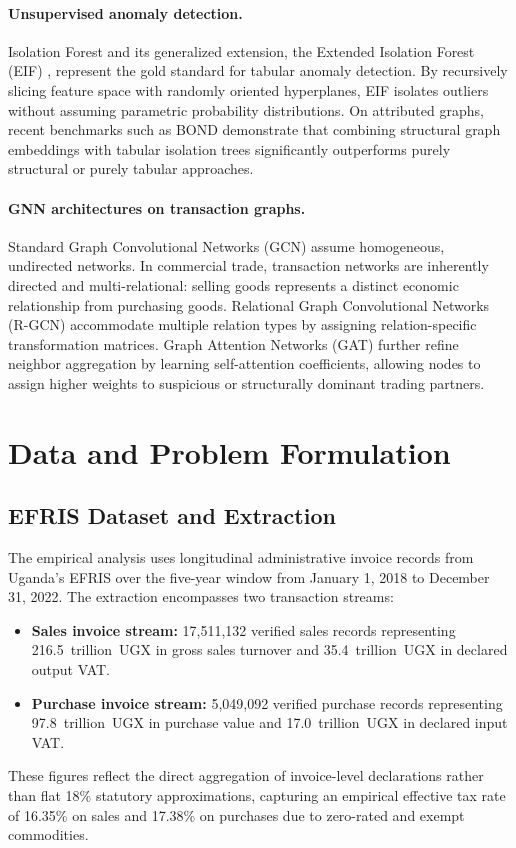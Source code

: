 \documentclass[10pt,twocolumn]{article}
\begin{document}
\paragraph{Unsupervised anomaly detection.}
Isolation Forest \cite{liu2008isolation} and its generalized extension, the Extended Isolation Forest (EIF) \cite{hariri2019extended}, represent the gold standard for tabular anomaly detection. By recursively slicing feature space with randomly oriented hyperplanes, EIF isolates outliers without assuming parametric probability distributions. On attributed graphs, recent benchmarks such as BOND \cite{liu2021anomaly} demonstrate that combining structural graph embeddings with tabular isolation trees significantly outperforms purely structural or purely tabular approaches.

\paragraph{GNN architectures on transaction graphs.}
Standard Graph Convolutional Networks (GCN) \cite{kipf2017semi} assume homogeneous, undirected networks. In commercial trade, transaction networks are inherently directed and multi-relational: selling goods represents a distinct economic relationship from purchasing goods. Relational Graph Convolutional Networks (R-GCN) \cite{schlichtkrull2018modeling} accommodate multiple relation types by assigning relation-specific transformation matrices. Graph Attention Networks (GAT) \cite{velickovic2018graph} further refine neighbor aggregation by learning self-attention coefficients, allowing nodes to assign higher weights to suspicious or structurally dominant trading partners.

\section{Data and Problem Formulation}
\label{sec:data}

\subsection{EFRIS Dataset and Extraction}
The empirical analysis uses longitudinal administrative invoice records from Uganda's EFRIS over the five-year window from January 1, 2018 to December 31, 2022. The extraction encompasses two transaction streams:
\begin{itemize}
  \item \textbf{Sales invoice stream:} 17,511,132 verified sales records representing 216.5~trillion~UGX in gross sales turnover and 35.4~trillion~UGX in declared output VAT.
  \item \textbf{Purchase invoice stream:} 5,049,092 verified purchase records representing 97.8~trillion~UGX in purchase value and 17.0~trillion~UGX in declared input VAT.
\end{itemize}
These figures reflect the direct aggregation of invoice-level declarations rather than flat 18\% statutory approximations, capturing an empirical effective tax rate of 16.35\% on sales and 17.38\% on purchases due to zero-rated and exempt commodities.
\end{document}
